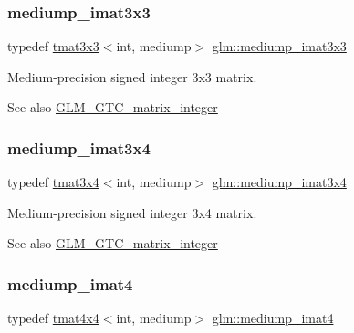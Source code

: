 \subsubsection{\texorpdfstring{mediump\+\_\+imat3x3}{mediump\_imat3x3}}
{\footnotesize\ttfamily typedef \hyperlink{structglm_1_1tmat3x3}{tmat3x3}$<$int, mediump$>$ \hyperlink{group__gtc__matrix__integer_gab4c647321a342c58119144ad08c6c406}{glm\+::mediump\+\_\+imat3x3}}

Medium-\/precision signed integer 3x3 matrix. \begin{DoxySeeAlso}{See also}
\hyperlink{group__gtc__matrix__integer}{G\+L\+M\+\_\+\+G\+T\+C\+\_\+matrix\+\_\+integer} 
\end{DoxySeeAlso}
\mbox{\label{group__gtc__matrix__integer_ga721a754fc35cc5ac097e331d893a6b2c}} 
\subsubsection{\texorpdfstring{mediump\+\_\+imat3x4}{mediump\_imat3x4}}
{\footnotesize\ttfamily typedef \hyperlink{structglm_1_1tmat3x4}{tmat3x4}$<$int, mediump$>$ \hyperlink{group__gtc__matrix__integer_ga721a754fc35cc5ac097e331d893a6b2c}{glm\+::mediump\+\_\+imat3x4}}

Medium-\/precision signed integer 3x4 matrix. \begin{DoxySeeAlso}{See also}
\hyperlink{group__gtc__matrix__integer}{G\+L\+M\+\_\+\+G\+T\+C\+\_\+matrix\+\_\+integer} 
\end{DoxySeeAlso}
\mbox{\label{group__gtc__matrix__integer_ga680c97868de08658ca4924718d951def}} 
\subsubsection{\texorpdfstring{mediump\+\_\+imat4}{mediump\_imat4}}
{\footnotesize\ttfamily typedef \hyperlink{structglm_1_1tmat4x4}{tmat4x4}$<$int, mediump$>$ \hyperlink{group__gtc__matrix__integer_ga680c97868de08658ca4924718d951def}{glm\+::mediump\+\_\+imat4}}

